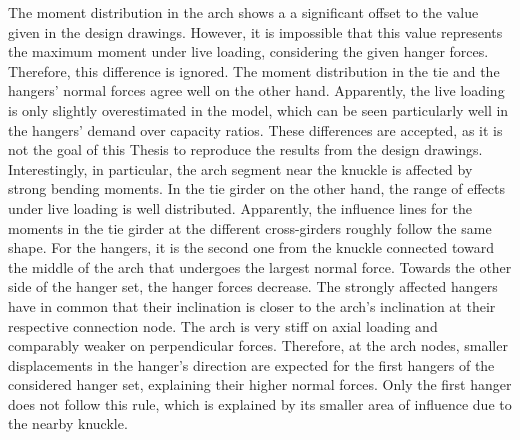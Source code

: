 The moment distribution in the arch shows a a significant offset to the value given in the design drawings. However, it is impossible that this value represents the maximum moment under live loading, considering the given hanger forces. Therefore, this difference is ignored. The moment distribution in the tie and the hangers' normal forces agree well on the other hand. Apparently, the live loading is only slightly overestimated in the model, which can be seen particularly well in the hangers' demand over capacity ratios. These differences are accepted, as it is not the goal of this Thesis to reproduce the results from the design drawings. Interestingly, in particular, the arch segment near the knuckle is affected by strong bending moments. In the tie girder on the other hand, the range of effects under live loading is well distributed. Apparently, the influence lines for the moments in the tie girder at the different cross-girders roughly follow the same shape. For the hangers, it is the second one from the knuckle connected toward the middle of the arch that undergoes the largest normal force. Towards the other side of the hanger set, the hanger forces decrease. The strongly affected hangers have in common that their inclination is closer to the arch's inclination at their respective connection node. The arch is very stiff on axial loading and comparably weaker on perpendicular forces. Therefore, at the arch nodes, smaller displacements in the hanger's direction are expected for the first hangers of the considered hanger set, explaining their higher normal forces. Only the first hanger does not follow this rule, which is explained by its smaller area of influence due to the nearby knuckle. \medskip

